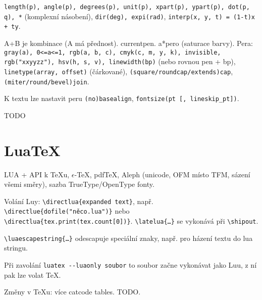 \documentclass[12pt]{article}					%
\begin{document}
    \begin{definice}
            \verb|length(p), angle(p), degrees(p), unit(p), xpart(p), ypart(p), dot(p, q), *| (komplexní násobení), \verb|dir(deg), expi(rad)|, \verb|interp(x, y, t) = (1-t)x + ty|.
    \end{definice}

    \begin{definice}[Pera]
        A+B je kombinace (A má přednost). currentpen. a*pero (saturace barvy). Pera: \verb|gray(a), 0<=a<=1, rgb(a, b, c), cmyk(c, m, y, k), invisible, rgb("xxyyzz"), hsv(h, s, v), linewidth(bp)| (nebo rovnou pen + bp), \verb|linetype(array, offset)| (čárkované), \verb|(square/roundcap/extends)cap|, \verb|(miter/round/bevel)join|.

        K textu lze nastavit peru \verb|(no)basealign|, \verb|fontsize(pt [, lineskip_pt])|.
    \end{definice}


    TODO

\section{LuaTeX}
    \begin{definice}
        LUA + API k TeXu, $\epsilon$-TeX, pdfTeX, Aleph (unicode, OFM místo TFM, sázení všemi směry), sazba TrueType/OpenType fonty.

        Volání Luy: \verb|\directlua{expanded text}|, např. \verb|\directlue{dofile("něco.lua")}| nebo \verb|\directlua{tex.print(tex.count[0])}|. \verb|\latelua{…}| se vykonává při \verb|\shipout|.

        \verb|\luaescapestring{…}| odescapuje speciální znaky, např. pro házení textu do lua stringu.
        
        Při zavolání \verb|luatex --luaonly soubor| to soubor začne vykonávat jako Luu, z ní pak lze volat TeX.

        Změny v TeXu: více catcode tables. TODO. 
    \end{definice}

\end{document}
